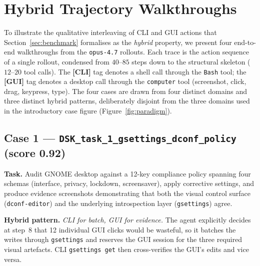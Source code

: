\section{Hybrid Trajectory Walkthroughs}
\label{app:trajectories}

To illustrate the qualitative interleaving of CLI and GUI actions that Section~\ref{sec:benchmark} formalises as the \emph{hybrid} property, we present four end-to-end walkthroughs from the \texttt{opus-4.7} rollouts. Each trace is the action sequence of a single rollout, condensed from $40$--$85$ steps down to the structural skeleton ($12$--$20$ tool calls). The \textcolor{cligrey}{\textbf{[CLI]}} tag denotes a shell call through the \texttt{Bash} tool; the \textcolor{guiblue}{\textbf{[GUI]}} tag denotes a desktop call through the \texttt{computer} tool (screenshot, click, drag, keypress, type). The four cases are drawn from four distinct domains and three distinct hybrid patterns, deliberately disjoint from the three domains used in the introductory case figure (Figure~\ref{fig:paradigm}).

\subsection{Case 1 --- \texttt{DSK\_task\_1\_gsettings\_dconf\_policy} (score 0.92)}
\label{app:case-dconf}

\textbf{Task.} Audit GNOME desktop against a 12-key compliance policy spanning four schemas (interface, privacy, lockdown, screensaver), apply corrective settings, and produce evidence screenshots demonstrating that both the visual control surface (\texttt{dconf-editor}) and the underlying introspection layer (\texttt{gsettings}) agree.

\textbf{Hybrid pattern.} \emph{CLI for batch, GUI for evidence.} The agent explicitly decides at step~8 that 12 individual GUI clicks would be wasteful, so it batches the writes through \texttt{gsettings} and reserves the GUI session for the three required visual artefacts. CLI \texttt{gsettings get} then cross-verifies the GUI's edits and vice versa.

